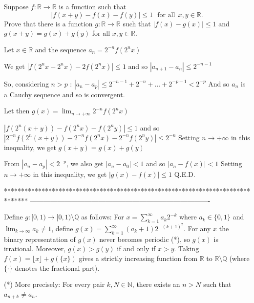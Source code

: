 \begin{solution}
	\begin{tcolorbox}Suppose $f:\mathbb{R} \to \mathbb{R}$ is a function such that 
\[|f(x+y)-f(x)-f(y)|\le 1\ \ \ \text{for all} \ \  x, y \in\mathbb R.\]
Prove that there is a function $g:\mathbb{R}\to\mathbb{R}$ such that $|f(x)-g(x)|\le 1$ and $g(x+y)=g(x)+g(y)$ for all $x,y \in\mathbb R.$\end{tcolorbox}
Let $x\in\mathbb R$ and the sequence $a_n=2^{-n}f(2^nx)$

We get $|f(2^nx+2^nx)-2f(2^nx)|\le 1$ and so $|a_{n+1}-a_n|\le 2^{-n-1}$

So, considering $n>p$ : $|a_n-a_p|\le 2^{-n-1}+2^{-n}+...+2^{-p-1}<2^{-p}$ And so $a_n$ is a Cauchy sequence and so is convergent.

Let then $g(x)=\lim_{n\to +\infty}2^{-n}f(2^nx)$

$|f(2^n(x+y))-f(2^nx)-f(2^ny)|\le 1$ and so $|2^{-n}f(2^n(x+y))-2^{-n}f(2^nx)-2^{-n}f(2^ny)|\le 2^{-n}$
Setting $n\to+\infty$ in this inequality, we get $g(x+y)=g(x)+g(y)$

From $|a_n-a_p|<2^{-p}$, we also get $|a_n-a_0|<1$ and so $|a_n-f(x)|<1$
Setting $n\to+\infty$ in this inequality, we get $|g(x)-f(x)|\le 1$
Q.E.D.
\end{solution}
*******************************************************************************
-------------------------------------------------------------------------------




\begin{solution}
	Define $g:[0,1)\to [0,1)\setminus \mathbb{Q}$ as follows: For $x=\sum_{k=1}^\infty a_k2^{-k}$ where $a_k \in \lbrace 0,1 \rbrace$ and $\lim_{k\to \infty}a_k\neq 1$, define $g(x)=\sum_{k=1}^\infty (a_k+1)2^{-(k+1)^2}$.  For any $x$ the binary representation of $g(x)$ never becomes periodic (*), so $g(x)$ is irrational.  Moreover, $g(x)>g(y)$ if and only if $x>y$.  Taking $f(x)=\lfloor x \rfloor + g\left(\lbrace x \rbrace \right)$ gives a strictly increasing function from $\mathbb{R}$ to $\mathbb{R}\setminus \mathbb{Q}$ (where $\lbrace \cdot \rbrace$ denotes the fractional part).

(*) More precisely: For every pair $k,N\in \mathbb{N}$, there exists an $n>N$ such that $a_{n+k}\neq a_n$.
\end{solution}



